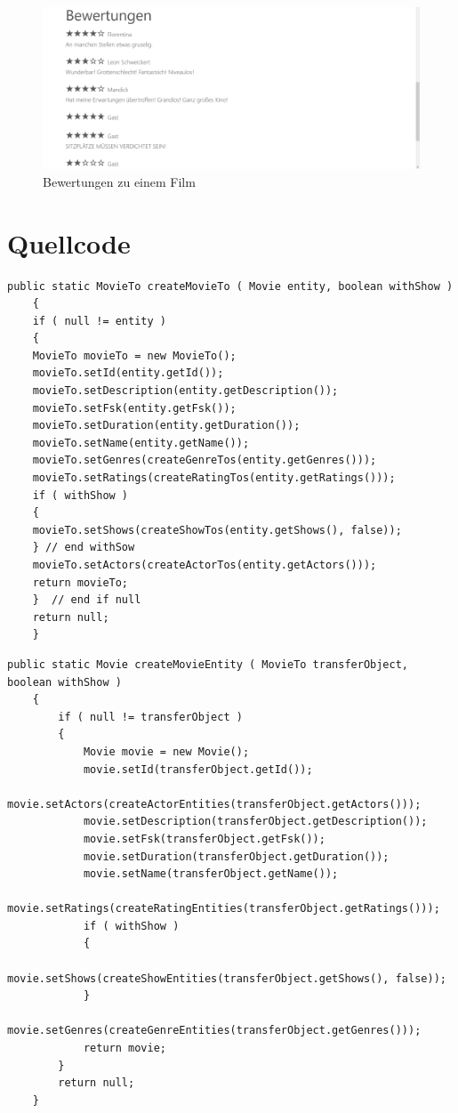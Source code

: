 \begin{figure}[!t]
	\centering
	\includegraphics[width=\textwidth]{img/screenshots/film04}
	\captionsetup{format=hang}
	\caption{Bewertungen zu einem Film}
	\label{fig:film04}
\end{figure}

\chapter{Quellcode}
\begin{minipage}{\linewidth}
	\begin{lstlisting}[style=lstJava]
	public static MovieTo createMovieTo ( Movie entity, boolean withShow )
	{
	if ( null != entity )
	{
	MovieTo movieTo = new MovieTo();
	movieTo.setId(entity.getId());
	movieTo.setDescription(entity.getDescription());
	movieTo.setFsk(entity.getFsk());
	movieTo.setDuration(entity.getDuration());
	movieTo.setName(entity.getName());
	movieTo.setGenres(createGenreTos(entity.getGenres()));
	movieTo.setRatings(createRatingTos(entity.getRatings()));
	if ( withShow )
	{
	movieTo.setShows(createShowTos(entity.getShows(), false));
	} // end withSow
	movieTo.setActors(createActorTos(entity.getActors()));
	return movieTo;
	}  // end if null
	return null;
	}
	\end{lstlisting}
	\label{lst:EntityToToHelper_movie}
\end{minipage}

\begin{minipage}{\linewidth}
	\begin{lstlisting}[style=lstJava]
	public static Movie createMovieEntity ( MovieTo transferObject, boolean withShow )
	{
		if ( null != transferObject )
		{
			Movie movie = new Movie();
			movie.setId(transferObject.getId());
			movie.setActors(createActorEntities(transferObject.getActors()));
			movie.setDescription(transferObject.getDescription());
			movie.setFsk(transferObject.getFsk());
			movie.setDuration(transferObject.getDuration());
			movie.setName(transferObject.getName());
			movie.setRatings(createRatingEntities(transferObject.getRatings()));
			if ( withShow )
			{
				movie.setShows(createShowEntities(transferObject.getShows(), false));
			}
			movie.setGenres(createGenreEntities(transferObject.getGenres()));
			return movie;
		}
		return null;
	}
	\end{lstlisting}
	\label{lst:ToToEntityHelper_movie}
\end{minipage}

